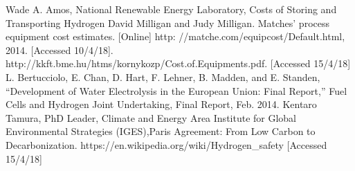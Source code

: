 \begin{thebibliography}{99}



















Wade A. Amos, National Renewable Energy Laboratory, Costs of Storing and Transporting Hydrogen
David Milligan and Judy Milligan. Matches’ process equipment cost estimates. [Online] http: //matche.com/equipcost/Default.html, 2014. [Accessed 10/4/18].
http://kkft.bme.hu/htms/kornykozp/Cost.of.Equipments.pdf. [Accessed 15/4/18]
L. Bertucciolo, E. Chan, D. Hart, F. Lehner, B. Madden, and E. Standen, “Development of Water Electrolysis in the European Union: Final Report,” Fuel Cells and Hydrogen Joint Undertaking, Final Report, Feb. 2014.
Kentaro Tamura, PhD Leader, Climate and Energy Area
Institute for Global Environmental Strategies (IGES),Paris Agreement: From Low Carbon to Decarbonization.
https://en.wikipedia.org/wiki/Hydrogen\_safety [Accessed 15/4/18]



\end{thebibliography}

%






